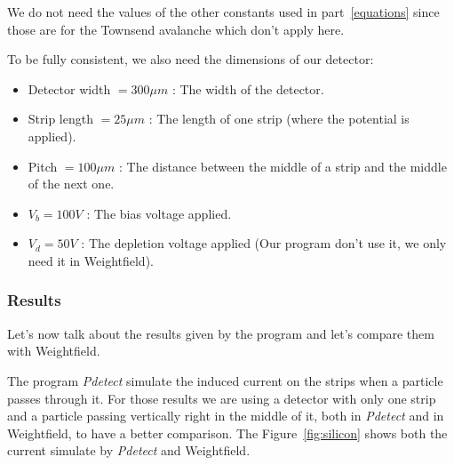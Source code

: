 \documentclass[11pt]{article}
\begin{document}
			We do not need the values of the other constants used in part~\ref{equations} since
			those are for the Townsend avalanche which don't apply here.

			To be fully consistent, we also need the dimensions of our detector:

			\begin{itemize}

				\item Detector width $= 300 \mu m$ : The width of the detector.
				\item Strip length $= 25 \mu m$ : The length of one strip (where the potential is
					applied).
				\item Pitch $= 100 \mu m$ : The distance between the middle of a strip and the middle
					of the next one.
				\item $V_b = 100 V$ : The bias voltage applied.
				\item $V_d = 50 V$ : The depletion voltage applied (Our program don't use it, we only
					need it in Weightfield).

			\end{itemize}

		\subsubsection*{Results}

			Let's now talk about the results given by the program and let's compare them with Weightfield.

			The program \textit{Pdetect} simulate the induced current on the strips when a particle passes through it.
			For those results we are using a detector with only one strip and a particle passing vertically right in
			the middle of it, both in \textit{Pdetect} and in Weightfield, to have a better comparison. The
			Figure~\ref{fig:silicon} shows both the current simulate by \textit{Pdetect} and Weightfield.
\end{document}
